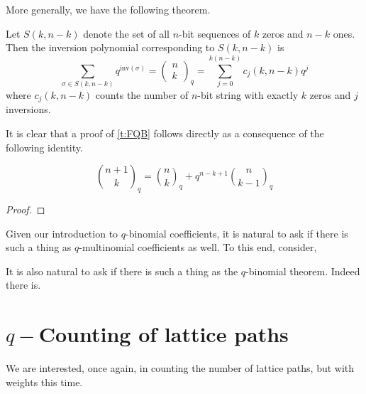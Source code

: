More generally, we have the following theorem.
\begin{theorem}
Let $S(k,n-k)$ denote the set of all $n$-bit sequences of $k$ zeros and $n-k$ ones. Then the inversion polynomial corresponding to $S(k,n-k)$ is \[\sum_{\sigma\in S(k,n-k)} q^{\text{inv}(\sigma)}=\left(\begin{array}{c}n \\ k \end{array}\right)_q = \sum_{j=0}^{k(n-k)}c_j(k,n-k)q^j\] where $c_j(k,n-k)$ counts the number of $n$-bit string with exactly $k$ zeros and $j$ inversions.
\label{t:FQB}
\end{theorem}
It is clear that a proof of \cref{t:FQB} follows directly as a consequence of the following identity.
\begin{claim}
\[
    \binom{n+1}{k}_q = \binom{n}{k}_q + q^{n-k+1}\binom{n}{k-1}_q
\]
\end{claim}
\begin{proof}
\end{proof}
Given our introduction to $q$-binomial coefficients, it is natural to ask if there is such a thing as $q$-multinomial coefficients as well. To this end, consider,
\begin{definition}
\end{definition}
It is also natural to ask if there is such a thing as the $q$-binomial theorem. Indeed there is.
\begin{theorem}
\end{theorem}
\section{\texorpdfstring{$q-$}-Counting of lattice paths}
We are interested, once again, in counting the number of lattice paths, but with weights this time.
\endinput
